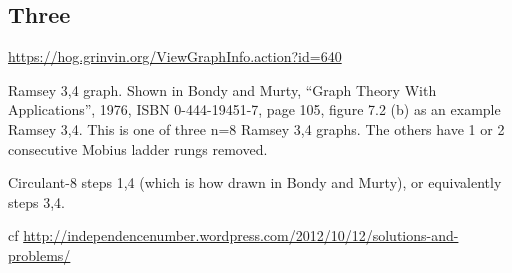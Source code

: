 \documentclass{article}
\begin{document}
\subsection{Three}

\url{https://hog.grinvin.org/ViewGraphInfo.action?id=640}

\smallskip

Ramsey 3,4 graph.  Shown in Bondy and Murty, ``Graph Theory With
Applications'', 1976, ISBN 0-444-19451-7, page 105, figure 7.2 (b) as
an example Ramsey 3,4.  This is one of three n=8 Ramsey 3,4 graphs.
The others have 1 or 2 consecutive Mobius ladder rungs removed.

Circulant-8 steps 1,4 (which is how drawn in Bondy and Murty), or
equivalently steps 3,4.

\smallskip

cf
{\scriptsize
\url{http://independencenumber.wordpress.com/2012/10/12/solutions-and-problems/}}
\end{document}
